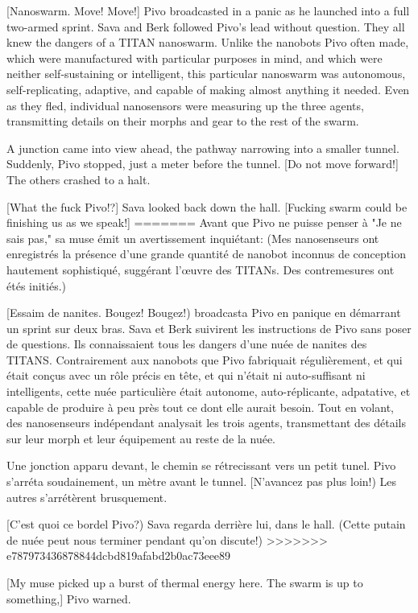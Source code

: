 [Nanoswarm. Move! Move!] Pivo broadcasted in a panic as he launched into a full two-armed sprint. Sava and Berk followed Pivo's lead without question. They all knew the dangers of a TITAN nanoswarm. Unlike the nanobots Pivo often made, which were manufactured with particular purposes in mind, and which were neither self-sustaining or intelligent, this particular nanoswarm was autonomous, self-replicating, adaptive, and capable of making almost anything it needed. Even as they fled, individual nanosensors were measuring up the three agents, transmitting details on their morphs and gear to the rest of the swarm. 

A junction came into view ahead, the pathway narrowing into a smaller tunnel. Suddenly, Pivo stopped, just a meter before the tunnel. [Do not move forward!] The others crashed to a halt. 

[What the fuck Pivo!?] Sava looked back down the hall. [Fucking swarm could be finishing us as we speak!] 
=======
Avant que Pivo ne puisse penser à "Je ne sais pas," sa muse émit un avertissement inquiétant: (Mes nanosenseurs ont enregistrés la présence d'une grande quantité de nanobot inconnus de conception hautement sophistiqué, suggérant l'œuvre des TITANs. Des contremesures ont étés initiés.) 

[Essaim de nanites. Bougez! Bougez!) broadcasta Pivo en panique en démarrant un sprint sur deux bras. Sava et Berk suivirent les instructions de Pivo sans poser de questions. Ils connaissaient tous les dangers d'une nuée de nanites des TITANS. Contrairement aux nanobots que Pivo fabriquait régulièrement, et qui était conçus avec un rôle précis en tête, et qui n'était ni auto-suffisant ni intelligents, cette nuée particulière était autonome, auto-réplicante, adpatative, et capable de produire à peu près tout ce dont elle aurait besoin. Tout en volant, des nanosenseurs indépendant analysait les trois agents, transmettant des détails sur leur morph et leur équipement au reste de la nuée. 

Une jonction apparu devant, le chemin se rétrecissant vers un petit tunel. Pivo s'arréta soudainement, un mètre avant le tunnel. [N'avancez pas plus loin!) Les autres s'arrétèrent brusquement. 

[C'est quoi ce bordel Pivo?) Sava regarda derrière lui, dans le hall. (Cette putain de nuée peut nous terminer pendant qu'on discute!) 
>>>>>>> e787973436878844dcbd819afabd2b0ac73eee89

[My muse picked up a burst of thermal energy here. The swarm is up to something,] Pivo warned. 

